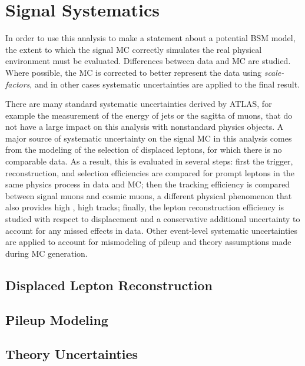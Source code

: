 \chapter{Signal Systematics}

In order to use this analysis to make a statement about a potential \ac{BSM} model, the extent to which the signal \ac{MC} correctly simulates the real physical environment must be evaluated. Differences between data and \ac{MC} are studied. Where possible, the \ac{MC} is corrected to better represent the data using \emph{scale-factors}, and in other cases systematic uncertainties are applied to the final result. 

There are many standard systematic uncertainties derived by \ac{ATLAS}, for example the measurement of the energy of jets or the sagitta of muons, that do not have a large impact on this analysis with nonstandard physics objects. A major source of systematic uncertainty on the signal \ac{MC} in this analysis comes from the modeling of the selection of displaced leptons, for which there is no comparable data. As a result, this is evaluated in several steps: first the trigger, reconstruction, and selection efficiencies are compared for prompt leptons in the same physics process in data and \ac{MC}; then the tracking efficiency is compared between signal muons and cosmic muons, a different physical phenomenon that also provides high \pt, high \absdz tracks; finally, the lepton reconstruction efficiency is studied with respect to displacement and a conservative additional uncertainty to account for any missed effects in data. Other event-level systematic uncertainties are applied to account for mismodeling of pileup and theory assumptions made during \ac{MC} generation. 


\section{Displaced Lepton Reconstruction}

\section{Pileup Modeling}

\section{Theory Uncertainties}

